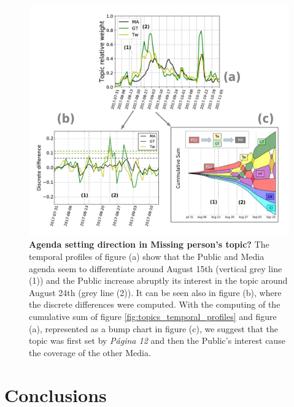 \documentclass[a4paper, 12pt]{article}
\begin{document}
\begin{figure}[H]
\includegraphics[width = \textwidth]{images/Fig8.pdf}
\caption{\textbf{Agenda setting direction in Missing person's topic?}
The temporal profiles of figure (a) show that the Public and Media agenda seem to differentiate around August 15th (vertical grey line (1)) and the Public increase abruptly its interest in the topic around August 24th (grey line (2)). It can be seen also in figure (b), where the discrete differences were computed. 
With the computing of the cumulative sum of figure \ref{fig:topics_temporal_profiles} and figure (a), represented as a bump chart in figure (c), we suggest that the topic was first set by \emph{P\'agina 12} and then the Public's interest cause the coverage of the other Media.
}
\label{fig:Maldonado_setagenda}
\end{figure}

\section{Conclusions}
\end{document}
